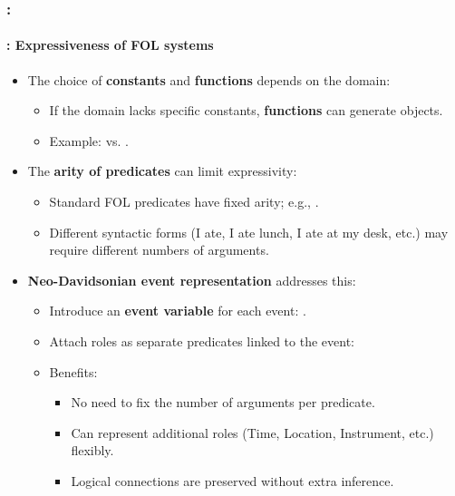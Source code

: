\documentclass[xcolor=table]{beamer}
\begin{document}
\begin{frame}
	\frametitle{\insertshortsubtitle: \insertsection}
	\framesubtitle{\insertsubsection: Expressiveness of FOL systems}
	
	\begin{itemize}
		\item The choice of \textbf{constants} and \textbf{functions} depends on the domain:
		\begin{itemize}
			\item If the domain lacks specific constants, \textbf{functions} can generate objects.
			\item Example:  vs. .
		\end{itemize}
		
		\item The \textbf{arity of predicates} can limit expressivity:
		\begin{itemize}
			\item Standard FOL predicates have fixed arity; e.g., .
			\item Different syntactic forms (I ate, I ate lunch, I ate at my desk, etc.) may require different numbers of arguments.
		\end{itemize}
		
		\item \textbf{Neo-Davidsonian event representation} addresses this:
		\begin{itemize}
			\item Introduce an \textbf{event variable} for each event: .
			\item Attach roles as separate predicates linked to the event:  \\
			\item Benefits:
			\begin{itemize}
				\item No need to fix the number of arguments per predicate.
				\item Can represent additional roles (Time, Location, Instrument, etc.) flexibly.
				\item Logical connections are preserved without extra inference.
			\end{itemize}
		\end{itemize}
		
	\end{itemize}
	
\end{frame}
\end{document}
